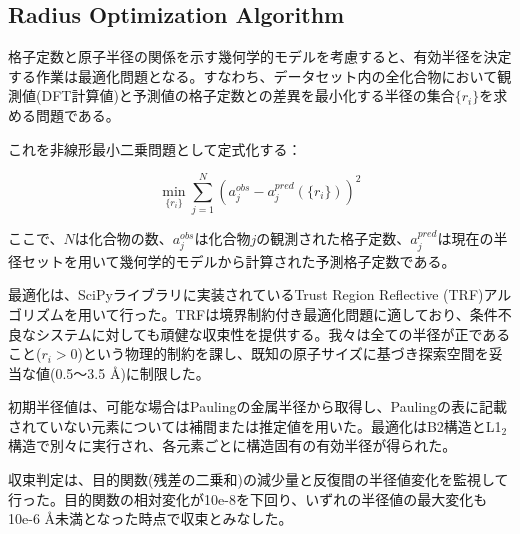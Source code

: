 \documentclass[a4paper,10pt,5p]{elsarticle}
\begin{document}
\subsection{Radius Optimization Algorithm}

格子定数と原子半径の関係を示す幾何学的モデルを考慮すると、有効半径を決定する作業は最適化問題となる。すなわち、データセット内の全化合物において観測値(DFT計算値)と予測値の格子定数との差異を最小化する半径の集合$\{r_i\}$を求める問題である。

これを非線形最小二乗問題として定式化する：



\begin{equation}
    \min_{\{r_i\}} \sum_{j=1}^{N} \left( a_j^{obs} - a_j^{pred}(\{r_i\}) \right)^2
    \label{eq:optimization}
\end{equation}

ここで、$N$は化合物の数、$a_j^{obs}$は化合物$j$の観測された格子定数、$a_j^{pred}$は現在の半径セットを用いて幾何学的モデルから計算された予測格子定数である。

最適化は、SciPyライブラリに実装されているTrust Region Reflective (TRF)アルゴリズムを用いて行った。TRFは境界制約付き最適化問題に適しており、条件不良なシステムに対しても頑健な収束性を提供する。我々は全ての半径が正であること($r_i > 0$)という物理的制約を課し、既知の原子サイズに基づき探索空間を妥当な値(0.5～3.5 \AA )に制限した。

初期半径値は、可能な場合はPaulingの金属半径から取得し、Paulingの表に記載されていない元素については補間または推定値を用いた。最適化はB2構造とL1$_2$構造で別々に実行され、各元素ごとに構造固有の有効半径が得られた。

収束判定は、目的関数(残差の二乗和)の減少量と反復間の半径値変化を監視して行った。目的関数の相対変化が10e-8を下回り、いずれの半径値の最大変化も10e-6 \AA 未満となった時点で収束とみなした。


\end{document}

